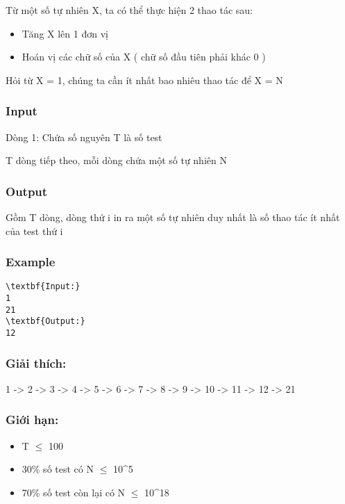 

Từ một số tự nhiên X, ta có thể thực hiện 2 thao tác sau:
\begin{itemize}
	\item Tăng X lên 1 đơn vị
	\item Hoán vị các chữ số của X ( chữ số đầu tiên phải khác 0 )
\end{itemize}

Hỏi từ X = 1, chúng ta cần ít nhất bao nhiêu thao tác để X = N

\subsubsection{Input}

Dòng 1: Chứa số nguyên T là số test

T dòng tiếp theo, mỗi dòng chứa một số tự nhiên N

\subsubsection{Output}

Gồm T dòng, dòng thứ i in ra một số tự nhiên duy nhất là số thao tác ít nhất của test thứ i

\subsubsection{Example}
\begin{verbatim}
\textbf{Input:}
1
21
\textbf{Output:}
12\end{verbatim}

\subsubsection{Giải thích:}

1 -> 2 -> 3 -> 4 -> 5 -> 6 -> 7 -> 8 -> 9 -> 10 -> 11 -> 12 -> 21

\subsubsection{Giới hạn:}
\begin{itemize}
	\item T  $\le$  100
	\item 30\% số test có N  $\le$  10^5
	\item 70\% số test còn lại có N  $\le$  10^18
\end{itemize}
